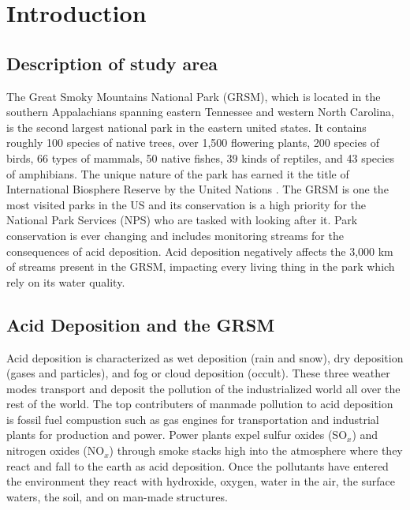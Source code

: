 \chapter{Introduction} \label{ch:intro}

\section{Description of study area}

The Great Smoky Mountains National Park (GRSM), which is located in the southern Appalachians spanning eastern Tennessee and western North Carolina, is the second largest national park in the eastern united states.
It contains roughly 100 species of native trees, over 1,500 flowering plants, 200 species of birds, 66 types of mammals, 50 native fishes, 39 kinds of reptiles, and 43 species of amphibians.
The unique nature of the park has earned it the title of  International Biosphere Reserve by the United Nations \citep{NPS}.	
The GRSM is one the most visited parks in the US and its conservation is a high priority for the National Park Services (NPS) who are tasked with looking after it.		
Park conservation is ever changing and  includes monitoring streams for the consequences of acid deposition.	
Acid deposition negatively affects the 3,000 km of streams present in the GRSM, impacting every living thing in the park which rely on its water quality.  
	
\section{Acid Deposition and the GRSM}

Acid deposition is characterized as wet deposition (rain and snow), dry deposition (gases and particles), and fog or cloud deposition (occult).
These three weather modes transport and deposit the pollution of the industrialized world all over the rest of the world.
The top contributers of  manmade pollution to acid deposition is fossil fuel compustion such as gas engines for transportation and industrial plants for production and power.
Power plants expel sulfur oxides (SO$_x$) and nitrogen oxides (NO$_x$) through smoke stacks high into the atmosphere where they react and fall to the earth as acid deposition.
Once the pollutants have entered the environment they react with hydroxide, oxygen, water in the air, the surface waters, the soil, and on man-made structures\citep{board1983acid}. 
 
